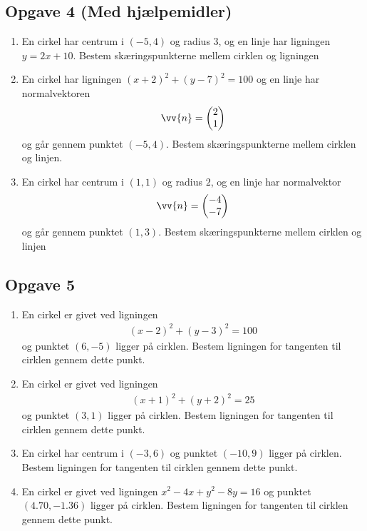 \subsection*{Opgave 4 (Med hjælpemidler)}
\begin{enumerate}[label=\roman*)]
	\item En cirkel har centrum i $(-5,4)$ og radius $3$, og en linje har ligningen $y = 2x+10$. Bestem skæringspunkterne mellem cirklen og ligningen
	\item En cirkel har ligningen $(x+2)^2+(y-7)^2 = 100$ og en linje har normalvektoren 
	\begin{align*}
		\vv{n} =
		\begin{pmatrix}
			2 \\ 1
		\end{pmatrix}
	\end{align*}
	og går gennem punktet $(-5,4)$. Bestem skæringspunkterne mellem cirklen og linjen. 
	\item En cirkel har centrum i $(1,1)$ og radius $2$, og en linje har normalvektor 
	\begin{align*}
		\vv{n} =
		\begin{pmatrix}
			-4 \\ -7			
		\end{pmatrix}
	\end{align*}
	og går gennem punktet $(1,3)$. Bestem skæringspunkterne mellem cirklen og linjen
\end{enumerate}

\subsection*{Opgave 5}
\begin{enumerate}[label=\roman*)]
	\item	En cirkel er givet ved ligningen 
	\begin{align*}
		(x-2)^2 + (y-3)^2 = 100
	\end{align*} og punktet $(6,-5)$ ligger på cirklen. Bestem ligningen for tangenten til cirklen gennem dette punkt.
	\item	En cirkel er givet ved ligningen
	\begin{align*}
		(x+1)^2 + (y+2)^2 = 25
	\end{align*}  og punktet	 $(3,1)$ ligger på cirklen. Bestem ligningen for tangenten til cirklen gennem dette punkt.	
	\item	En cirkel har centrum i $(-3,6)$ og punktet $(-10,9)$
	ligger på cirklen. Bestem ligningen for tangenten til cirklen gennem dette punkt.	
	\item	En cirkel er givet ved ligningen $x^2-4x+y^2-8y=16$ og punktet
	 $(4.70,-1.36)$
	ligger på cirklen. Bestem ligningen for tangenten til cirklen gennem dette punkt.	
\end{enumerate}

